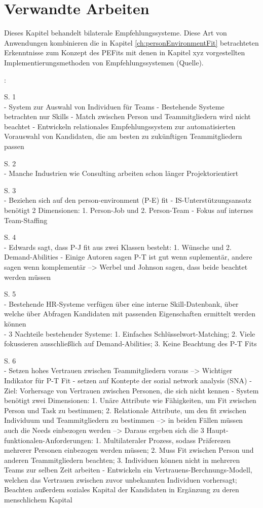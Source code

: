 \chapter{Verwandte Arbeiten}
\label{ch:verwandteArbeiten}
Dieses Kapitel behandelt bilaterale Empfehlungssysteme. Diese Art von Anwendungen kombinieren die in Kapitel \ref{ch:personEnvironmentFit} betrachteten Erkenntnisse zum Konzept des \acp{PEFit} mit denen in Kapitel xyz vorgestellten Implementierungsmethoden von Empfehlungssystemen (Quelle).

\textcite{malinowski:2008}:

S. 1\\
- System zur Auswahl von Individuen für Teams
- Bestehende Systeme betrachten nur Skills - Match zwischen Person und Teammitgliedern wird nicht beachtet
- Entwickeln relationales Empfehlungssystem zur automatisierten Vorauswahl von Kandidaten, die am besten zu zukünftigen Teammitgliedern passen

S. 2\\
- Manche Industrien wie Consulting arbeiten schon länger Projektorientiert

S. 3\\
- Beziehen sich auf den person-environment (P-E) fit
- IS-Unterstützungsansatz benötigt 2 Dimensionen: 1. Person-Job und 2. Person-Team
- Fokus auf internes Team-Staffing

S. 4\\
- Edwards sagt, dass P-J fit aus zwei Klassen besteht: 1. Wünsche und 2. Demand-Abilities
- Einige Autoren sagen P-T ist gut wenn suplementär, andere sagen wenn komplementär --> Werbel und Johnson sagen, dass beide beachtet werden müssen

S. 5\\
- Bestehende HR-Systeme verfügen über eine interne Skill-Datenbank, über welche über Abfragen Kandidaten mit passenden Eigenschaften ermittelt werden können\\
- 3 Nachteile bestehender Systeme: 1. Einfaches Schlüsselwort-Matching; 2. Viele fokussieren ausschließlich auf Demand-Abilities; 3. Keine Beachtung des P-T Fits

S. 6\\
- Setzen hohes Vertrauen zwischen Teammitgliedern voraus --> Wichtiger Indikator für P-T Fit
- setzen auf Kontepte der sozial network analysis (SNA)
- Ziel: Vorhersage von Vertrauen zwischen Personen, die sich nicht kennen
- System benötigt zwei Dimensionen: 1. Unäre Attribute wie Fähigkeiten, um Fit zwischen Person und Task zu bestimmen; 2. Relationale Attribute, um den fit zwischen Individuum und Teammitgliedern zu bestimmen --> in beiden Fällen müssen auch die Needs einbezogen werden --> Daraus ergeben sich die 3 Haupt-funktionalen-Anforderungen: 1. Multilateraler Prozess, sodass Präferezen mehrerer Personen einbezogen werden müssen; 2. Muss Fit zwischen Person und anderen Teammitgliedern beachten; 3. Individuen können nicht in mehreren Teams zur selben Zeit arbeiten
- Entwickeln ein Vertrauens-Berchnungs-Modell, welchen das Vertrauen zwischen zuvor unbekannten Individuen vorhersagt; Beachten außerdem soziales Kapital der Kandidaten in Ergänzung zu deren menschlichem Kapital

